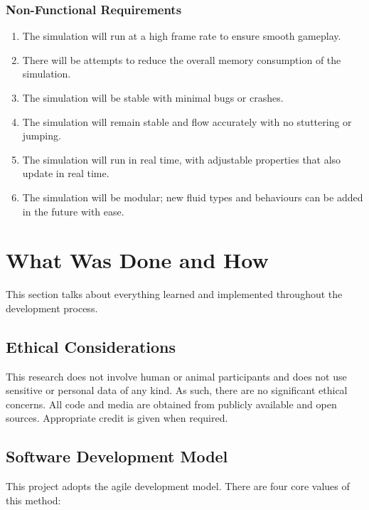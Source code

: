 \documentclass[12pt]{article}
\begin{document}
    \subsubsection{Non-Functional Requirements}

    \begin{enumerate}[label=\textbf{N.F.R. \arabic*}]
        \item The simulation will run at a high frame rate to ensure smooth gameplay.
        \item There will be attempts to reduce the overall memory consumption of the simulation.
        \item The simulation will be stable with minimal bugs or crashes.
        \item The simulation will remain stable and flow accurately with no stuttering or jumping.
        \item The simulation will run in real time, with adjustable properties that also update in real time.
        \item The simulation will be modular; new fluid types and behaviours can be added in the future with ease.
    \end{enumerate}

    \newpage

    \section{What Was Done and How}
    \label{sec:whatwasdoneandhow}

    This section talks about everything learned and implemented throughout the development process.

    \subsection{Ethical Considerations}
    
    This research does not involve human or animal participants and does not use sensitive or personal data of any kind. As such, there are no significant ethical concerns. All code and media are obtained from publicly available and open sources. Appropriate credit is given when required.

    \subsection{Software Development Model}

    This project adopts the agile development model. There are four core values of this method\cite{geekagile}:
    
\end{document}
